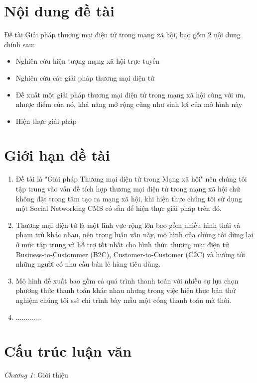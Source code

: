 \section{Nội dung đề tài}
Đề tài \"Giải pháp thương mại điện tử trong mạng xã hội\", bao gồm 2 nội dung chính sau:
\begin{itemize}
	\item Nghiên cứu hiện tượng mạng xã hội trực tuyến
	\item Nghiên cứu các giải pháp thương mại điện tử
	\item Đề xuất một giải pháp thương mại điện tử trong mạng xã hội cùng với ưu, nhược điểm của nó, khả năng mở rộng cũng như sinh lợi của mô hình này
	\item Hiện thực giải pháp
\end{itemize}

\section{Giới hạn đề tài}
\begin{enumerate}
	\item Đề tài là "Giải pháp Thương mại điện tử trong Mạng xã hội" nên chúng tôi tập trung vào vấn đề tích hợp thương mại điện tử trong mạng xã hội chứ không đặt trọng tâm tạo ra mạng xã hội, khi hiện thực chúng tôi sử dụng một Social Networking CMS có sẵn để hiện thực giải pháp trên đó.
	
	\item Thương mại điện tử là một lĩnh vực rộng lớn bao gồm nhiều hình thái và phạm trù khác nhau, nên trong luận văn này, mô hình của chúng tôi dừng lại ở mức tập trung và hỗ trợ tốt nhất cho hình thức thương mại điện tử Business-to-Custommer (B2C), Customer-to-Customer (C2C) và hướng tới những người có nhu cầu bán lẻ hàng tiêu dùng.
	
	\item Mô hình đề xuất bao gồm cả quá trình thanh toán với nhiều sự lựa chọn phương thức thanh toán khác nhau nhưng trong việc hiện thực bản thử nghiệm chúng tôi ssẽ chỉ trình bày mẫu một cổng thanh toán mà thôi.
	
	\item .............
\end{enumerate}

\section{Cấu trúc luận văn}
\textit{Chương 1:} Giới thiệu

